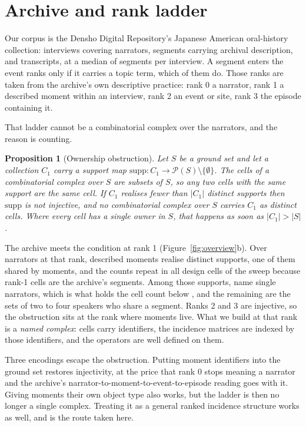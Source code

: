 \documentclass[conference]{IEEEtran}
\newtheorem{proposition}{Proposition}
\begin{document}
\section{Archive and rank ladder}

Our corpus is the Densho Digital Repository's Japanese American oral-history collection:
\nInterviews{} interviews
covering \nNarrators{} narrators, \nSegments{} segments carrying archival description, and
\nTranscripts{} transcripts, at a median of \medianSegments{} segments per interview. A
segment enters the event ranks only if it carries a topic term, which \segmentsWithTopics{}
of them do. Those ranks are taken from the archive's own
descriptive practice: rank 0 a narrator, rank 1 a
described moment within an interview, rank 2 an event or site, rank 3 the episode containing
it.

That ladder cannot be a combinatorial complex over the narrators, and the reason is
counting.

\begin{proposition}[Ownership obstruction]
\label{prop:obstruction}
Let $S$ be a ground set and let a collection $C_1$ carry a support map
$\mathrm{supp}: C_1 \to \mathcal{P}(S)\setminus\{\emptyset\}$. The cells of a combinatorial
complex over $S$ are subsets of $S$, so any two cells with the same support are the same
cell. If $C_1$ realises fewer than $|C_1|$ distinct supports then $\mathrm{supp}$ is not
injective, and no combinatorial complex over $S$ carries $C_1$ as distinct cells. Where every
cell has a single owner in $S$, that happens as soon as $|C_1| > |S|$.
\end{proposition}

The archive meets the condition at rank 1 (Figure~\ref{fig:overview}b). Over \obsGround{}
narrators at that rank, \obsCells{} described
moments realise \obsDistinct{} distinct supports, one of them shared by \obsMaxMult{} moments,
and the counts repeat in all \obsDesignCells{} design cells of the sweep because rank-1 cells
are the archive's segments. Among those supports, \obsSingletonSupports{} name single
narrators,
which is what holds the cell count below \obsGround{}, and the remaining \obsMultiSupports{}
are
the sets of two to four speakers who share a segment. Ranks 2 and 3 are injective, so the
obstruction sits at the rank
where moments live. What we build at that rank is a \emph{named complex}: cells carry
identifiers, the
incidence matrices are indexed by those identifiers, and the operators are well defined on
them.

Three encodings escape the obstruction. Putting
moment identifiers into the ground set restores injectivity, at the price that rank 0 stops
meaning a narrator and the archive's narrator-to-moment-to-event-to-episode reading goes with
it. Giving moments their own object type also works, but the ladder is then no longer a
single complex. Treating it as a general ranked incidence structure works as well,
and is the route taken here.
\end{document}
